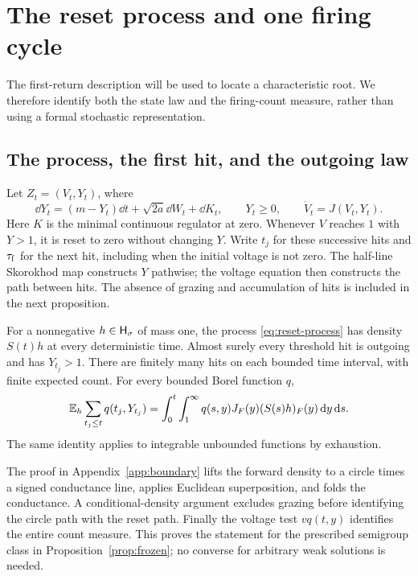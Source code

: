 \section{The reset process and one firing cycle}\label{sec:returns}

The first-return description will be used to locate a characteristic
root. We therefore identify both the state law and the firing-count
measure, rather than using a formal stochastic representation.

\subsection{The process, the first hit, and the outgoing law}

Let $Z_t=(V_t,Y_t)$, where
\begin{equation}\label{eq:reset-process}
 \dd Y_t=(m-Y_t)\dd t+\sqrt{2a}\dd W_t+\dd K_t,\qquad Y_t\ge0,
 \qquad \dot V_t=J(V_t,Y_t).
\end{equation}
Here $K$ is the minimal continuous regulator at zero. Whenever $V$ reaches
$1$ with $Y>1$, it is reset to zero without changing $Y$. Write $t_j$ for
these successive hits and ${\tau_{\mathrm f}}$ for the next hit, including when the
initial voltage is not zero. The half-line Skorokhod map constructs $Y$
pathwise; the voltage equation then constructs the path between hits.
The absence of grazing and accumulation of hits is included in the next
proposition.

\begin{proposition}\label{prop:process}
For a nonnegative $h\in\mathsf H_\sigma$ of mass one, the process
\eqref{eq:reset-process} has density $S(t)h$ at every deterministic time.
Almost surely every threshold hit is outgoing and has $Y_{t_j}>1$.
There are finitely many hits on each bounded time interval, with finite
expected count. For every bounded Borel function $q$,
\begin{equation}\label{eq:count-measure}
 \mathbb E_h\sum_{t_j\le t}q(t_j,Y_{t_j})
 =\int_0^t\int_1^\infty q(s,y)J_F(y)(S(s)h)_F(y)\,\mathrm d y\,\mathrm d s.
\end{equation}
The same identity applies to integrable unbounded functions by
exhaustion.
\end{proposition}

The proof in Appendix~\ref{app:boundary} lifts the forward density to a
circle times a signed conductance line, applies Euclidean superposition,
and folds the conductance. A conditional-density argument excludes
grazing before identifying the circle path with the reset path.
Finally the voltage test $vq(t,y)$ identifies the entire count measure.
This proves the statement for the prescribed semigroup class in
Proposition~\ref{prop:frozen}; no converse for arbitrary weak solutions is
needed.

